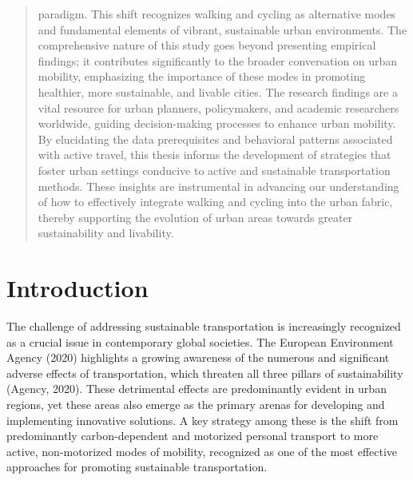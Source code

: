 \documentclass[12pt,twoside]{reedthesis}
\begin{document}
\begin{abstract}
paradigm. This shift recognizes walking and cycling as alternative modes and fundamental elements of vibrant, sustainable urban environments. The comprehensive nature of this study goes beyond presenting empirical findings; it contributes significantly to the broader conversation on urban mobility, emphasizing the importance of these modes in promoting healthier, more sustainable, and livable cities. The research findings are a vital resource for urban planners, policymakers, and academic researchers worldwide, guiding decision-making processes to enhance urban mobility. By elucidating the data prerequisites and behavioral patterns associated with active travel, this thesis informs the development of strategies that foster urban settings conducive to active and sustainable transportation methods. These insights are instrumental in advancing our understanding of how to effectively integrate walking and cycling into the urban fabric, thereby supporting the evolution of urban areas towards greater sustainability and livability.
  \end{abstract}

\mainmatter %
\pagestyle{fancyplain} %

\hypertarget{introduction}{%
\chapter*{Introduction}\label{introduction}}

The challenge of addressing sustainable transportation is increasingly recognized as a crucial issue in contemporary global societies. The European Environment Agency (2020) highlights a growing awareness of the numerous and significant adverse effects of transportation, which threaten all three pillars of sustainability (Agency, 2020). These detrimental effects are predominantly evident in urban regions, yet these areas also emerge as the primary arenas for developing and implementing innovative solutions. A key strategy among these is the shift from predominantly carbon-dependent and motorized personal transport to more active, non-motorized modes of mobility, recognized as one of the most effective approaches for promoting sustainable transportation.
\end{document}
